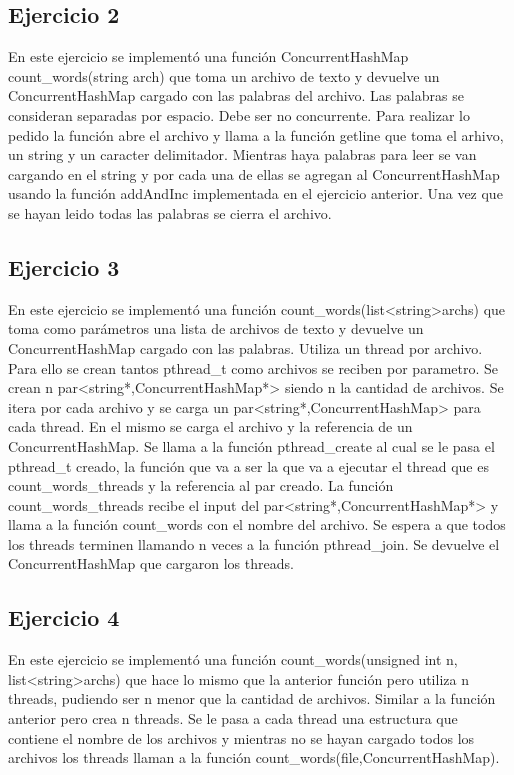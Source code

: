 \documentclass[a4paper]{article}
\begin{document}
{\begin{itemize}
\end{itemize}

\subsection{Ejercicio 2}

En este ejercicio se implementó una función ConcurrentHashMap count_words(string arch) que toma un archivo de texto y devuelve un ConcurrentHashMap cargado con las palabras del archivo. Las palabras se consideran separadas por espacio. Debe ser no concurrente.
Para realizar lo pedido la función abre el archivo y llama a la función getline que toma el arhivo, un string y un caracter delimitador. Mientras haya palabras para leer se van cargando en el string y por cada una de ellas se agregan al ConcurrentHashMap usando la función addAndInc implementada en el ejercicio anterior. Una vez que se hayan leido todas las palabras se cierra el archivo.


\subsection{Ejercicio 3}

En este ejercicio se implementó una función count_words(list<string>archs) que toma como parámetros una lista de archivos de texto y devuelve un ConcurrentHashMap cargado con las palabras. Utiliza un thread por archivo.
Para ello se crean tantos pthread_t como archivos se reciben por parametro. Se crean n par<string*,ConcurrentHashMap*> siendo n la cantidad de archivos. Se itera por cada archivo y se carga un par<string*,ConcurrentHashMap> para cada thread. En el mismo se carga el archivo y la referencia de un ConcurrentHashMap. Se llama a la función pthread_create al cual se le pasa el pthread_t creado, la función que va a ser la que va a ejecutar el thread que es count_words_threads y la referencia al par creado. La función count_words_threads recibe el input del par<string*,ConcurrentHashMap*> y llama a la función count_words con el nombre del archivo. Se espera a que todos los threads terminen llamando n veces a la función pthread_join. Se devuelve el ConcurrentHashMap que cargaron los threads.


\subsection{Ejercicio 4}
En este ejercicio se implementó una función count_words(unsigned int n, list<string>archs) que hace lo mismo que la anterior función pero utiliza n threads, pudiendo ser n menor que la cantidad de archivos. Similar a la función anterior pero crea n threads. Se le pasa a cada thread una estructura que contiene el nombre de los archivos y mientras no se hayan cargado todos los archivos los threads llaman a la función count_words(file,ConcurrentHashMap).

}
\end{document}
